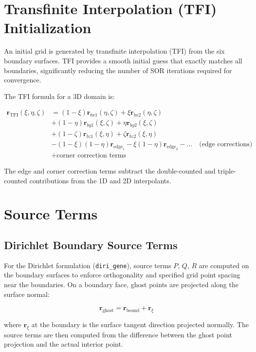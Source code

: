 \documentclass[11pt,a4paper]{report}
\newcommand{\rvec}{\bm{r}}
\begin{document}
\section{Transfinite Interpolation (TFI) Initialization}

An initial grid is generated by transfinite interpolation (TFI) from the six boundary surfaces. TFI provides a smooth initial guess that exactly matches all boundaries, significantly reducing the number of SOR iterations required for convergence.

The TFI formula for a 3D domain is:

\begin{align}
    \rvec_{\text{TFI}}(\xi, \eta, \zeta) &= (1-\xi)\rvec_{bx1}(\eta,\zeta) + \xi\rvec_{bx2}(\eta,\zeta) \nonumber\\
    &+ (1-\eta)\rvec_{by1}(\xi,\zeta) + \eta\rvec_{by2}(\xi,\zeta) \nonumber\\
    &+ (1-\zeta)\rvec_{bz1}(\xi,\eta) + \zeta\rvec_{bz2}(\xi,\eta) \nonumber\\
    &- (1-\xi)(1-\eta)\rvec_{\text{edge}_1} - \xi(1-\eta)\rvec_{\text{edge}_2} - \dots \quad \text{(edge corrections)} \nonumber\\
    &+ \text{corner correction terms}
\end{align}

The edge and corner correction terms subtract the double-counted and triple-counted contributions from the 1D and 2D interpolants.

\section{Source Terms}

\subsection{Dirichlet Boundary Source Terms}

For the Dirichlet formulation (\texttt{diri\_gene}), source terms $P$, $Q$, $R$ are computed on the boundary surfaces to enforce orthogonality and specified grid point spacing near the boundaries. On a boundary face, ghost points are projected along the surface normal:

\begin{equation}
    \rvec_{\text{ghost}} = \rvec_{\text{bound}} + \rvec_\xi
\end{equation}

where $\rvec_\xi$ at the boundary is the surface tangent direction projected normally. The source terms are then computed from the difference between the ghost point projection and the actual interior point.
\end{document}
